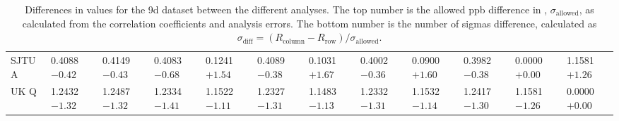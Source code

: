 \begin{landscape}
\begin{table}
\begin{tabularx}{1\linewidth}{@{\extracolsep{\fill}}lXXXXXXXXXXX}
	SJTU A & 0.4088 $-0.42$ & 0.4149 $-0.43$ & 0.4083 $-0.68$ & 0.1241 $+1.54$ & 0.4089 $-0.38$ & 0.1031 $+1.67$ & 0.4002 $-0.36$ & 0.0900 $+1.60$ & 0.3982 $-0.38$ & 0.0000 $+0.00$ & 1.1581 $+1.26$  \\
	UK Q   & 1.2432 $-1.32$ & 1.2487 $-1.32$ & 1.2334 $-1.41$ & 1.1522 $-1.11$ & 1.2327 $-1.31$ & 1.1483 $-1.13$ & 1.2332 $-1.31$ & 1.1532 $-1.14$ & 1.2417 $-1.30$ & 1.1581 $-1.26$ & 0.0000 $+0.00$  \\
  \bottomrule
\end{tabularx}
\caption[]{Differences in \R values for the 9d dataset between the different analyses. The top number is the allowed ppb difference in \R, $\sigma_{\text{allowed}}$, as calculated from the correlation coefficients and analysis errors. The bottom number is the number of sigmas difference, calculated as $\sigma_{\text{diff}} = (R_{\text{column}}-R_{\text{row}})/\sigma_{\text{allowed}}$.}
\label{tab:9d_diff}
\end{table}
\end{landscape}




